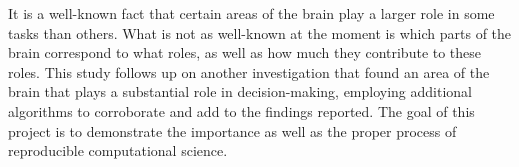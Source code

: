 
\par It is a well-known fact that certain areas of the brain play a larger role
in some tasks than others. What is not as well-known at the moment is which
parts of the brain correspond to what roles, as well as how much they contribute
to these roles. This study follows up on another investigation that found an
area of the brain that plays a substantial role in decision-making, employing
additional algorithms to corroborate and add to the findings reported. The goal
of this project is to demonstrate the importance as well as the proper process
of reproducible computational science.
